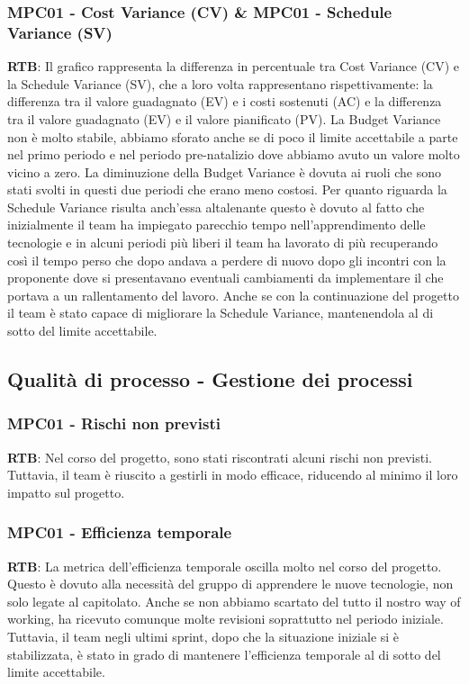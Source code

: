 \documentclass[10pt]{article}
\begin{document}
\begin{justify}
\subsubsection{MPC01 - Cost Variance (CV) \& MPC01 - Schedule Variance (SV)}
\textbf{RTB}: Il grafico rappresenta la differenza in percentuale tra Cost Variance (CV) e la Schedule Variance (SV), che a loro volta rappresentano rispettivamente: 
la differenza tra il valore guadagnato (EV) e i costi sostenuti (AC) e la differenza tra il valore guadagnato (EV) e il valore pianificato (PV). La Budget Variance 
non è molto stabile, abbiamo sforato anche se di poco il limite accettabile a parte nel primo periodo e nel periodo pre-natalizio dove abbiamo avuto un valore molto 
vicino a zero. La diminuzione della Budget Variance è dovuta ai ruoli che sono stati svolti in questi due periodi che erano meno costosi. Per quanto riguarda la 
Schedule Variance risulta anch'essa altalenante questo è dovuto al fatto che inizialmente il team ha impiegato parecchio tempo nell'apprendimento delle tecnologie e 
in alcuni periodi più liberi il team ha lavorato di più recuperando così il tempo perso che dopo andava a perdere di nuovo dopo gli incontri con la proponente dove 
si presentavano eventuali cambiamenti da implementare il che portava a un rallentamento del lavoro. Anche se con la continuazione del progetto il team è stato capace 
di migliorare la Schedule Variance, mantenendola al di sotto del limite accettabile.
\subsection{Qualità di processo - Gestione dei processi}
\subsubsection{MPC01 - Rischi non previsti}
\textbf{RTB}: Nel corso del progetto, sono stati riscontrati alcuni rischi non previsti. Tuttavia, il team è riuscito a gestirli in modo efficace, riducendo al minimo 
il loro impatto sul progetto.
\subsubsection{MPC01 - Efficienza temporale}
\textbf{RTB}: La metrica dell'efficienza temporale oscilla molto nel corso del progetto. Questo è dovuto alla necessità del gruppo di apprendere le nuove tecnologie, 
non solo legate al capitolato. Anche se non abbiamo scartato del tutto il nostro way of working, ha ricevuto comunque molte revisioni soprattutto nel periodo iniziale. 
Tuttavia, il team negli ultimi sprint, dopo che la situazione iniziale si è stabilizzata, è stato in grado di mantenere l'efficienza temporale al di sotto del limite 
accettabile.

\end{justify}
\end{document}
